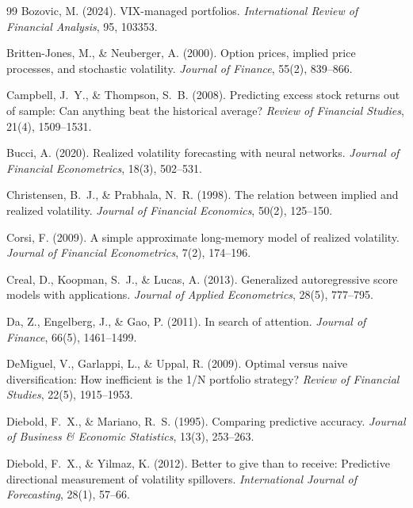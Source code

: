 \documentclass[12pt,a4paper]{article}
\begin{document}
\begin{thebibliography}{99}
Bozovic, M. (2024). VIX-managed portfolios. \textit{International Review of Financial Analysis}, 95, 103353.

Britten-Jones, M., \& Neuberger, A. (2000). Option prices, implied price processes, and stochastic volatility. \textit{Journal of Finance}, 55(2), 839--866.

Campbell, J.~Y., \& Thompson, S.~B. (2008). Predicting excess stock returns out of sample: Can anything beat the historical average? \textit{Review of Financial Studies}, 21(4), 1509--1531.

Bucci, A. (2020). Realized volatility forecasting with neural networks. \textit{Journal of Financial Econometrics}, 18(3), 502--531.

Christensen, B.~J., \& Prabhala, N.~R. (1998). The relation between implied and realized volatility. \textit{Journal of Financial Economics}, 50(2), 125--150.

Corsi, F. (2009). A simple approximate long-memory model of realized volatility. \textit{Journal of Financial Econometrics}, 7(2), 174--196.

Creal, D., Koopman, S.~J., \& Lucas, A. (2013). Generalized autoregressive score models with applications. \textit{Journal of Applied Econometrics}, 28(5), 777--795.

Da, Z., Engelberg, J., \& Gao, P. (2011). In search of attention. \textit{Journal of Finance}, 66(5), 1461--1499.

DeMiguel, V., Garlappi, L., \& Uppal, R. (2009). Optimal versus naive diversification: How inefficient is the 1/N portfolio strategy? \textit{Review of Financial Studies}, 22(5), 1915--1953.

Diebold, F.~X., \& Mariano, R.~S. (1995). Comparing predictive accuracy. \textit{Journal of Business \& Economic Statistics}, 13(3), 253--263.

Diebold, F.~X., \& Yilmaz, K. (2012). Better to give than to receive: Predictive directional measurement of volatility spillovers. \textit{International Journal of Forecasting}, 28(1), 57--66.


\end{thebibliography}
\end{document}
